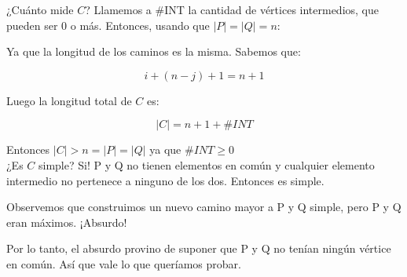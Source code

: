 \documentclass{article}
\begin{document}
¿Cuánto mide $C$? Llamemos a \#INT la cantidad de vértices intermedios, que pueden ser 0 o más. Entonces, usando que $|P| = |Q| = n$:

Ya que la longitud de los caminos es la misma. Sabemos que:  

\[ i + (n - j) + 1 = n + 1 \]

Luego la longitud total de $C$ es:

\[ |C| = n + 1 + \#INT \]

Entonces $|C| > n = |P| = |Q|$ ya que  $ \#INT \ge 0$\\ 
¿Es $C$ simple? Si! P y Q no tienen elementos en común y cualquier elemento intermedio no pertenece a ninguno de los dos. Entonces es simple.

Observemos que  construimos un nuevo camino mayor a P y Q simple, pero P y Q eran máximos. ¡Absurdo!

Por lo tanto, el absurdo provino de suponer que P y Q no tenían ningún vértice en común. Así que vale lo que queríamos probar.
\end{document}
